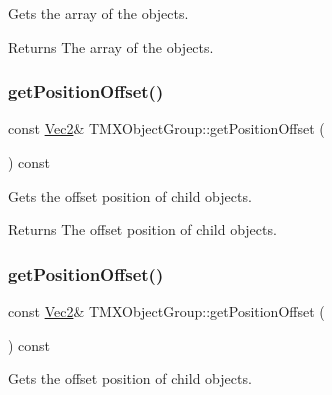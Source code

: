 Gets the array of the objects.

\begin{DoxyReturn}{Returns}
The array of the objects. 
\end{DoxyReturn}
\mbox{\label{classTMXObjectGroup_aa11982f548c2a8fe561c882201f82e29}} 
\subsubsection{\texorpdfstring{get\+Position\+Offset()}{getPositionOffset()}\hspace{0.1cm}{\footnotesize\ttfamily [1/2]}}
{\footnotesize\ttfamily const \hyperlink{classVec2}{Vec2}\& T\+M\+X\+Object\+Group\+::get\+Position\+Offset (\begin{DoxyParamCaption}{ }\end{DoxyParamCaption}) const\hspace{0.3cm}{\ttfamily [inline]}}

Gets the offset position of child objects.

\begin{DoxyReturn}{Returns}
The offset position of child objects. 
\end{DoxyReturn}
\mbox{\label{classTMXObjectGroup_aa11982f548c2a8fe561c882201f82e29}} 
\subsubsection{\texorpdfstring{get\+Position\+Offset()}{getPositionOffset()}\hspace{0.1cm}{\footnotesize\ttfamily [2/2]}}
{\footnotesize\ttfamily const \hyperlink{classVec2}{Vec2}\& T\+M\+X\+Object\+Group\+::get\+Position\+Offset (\begin{DoxyParamCaption}{ }\end{DoxyParamCaption}) const\hspace{0.3cm}{\ttfamily [inline]}}

Gets the offset position of child objects.

